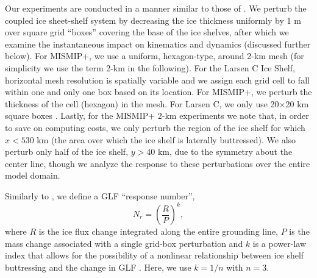 \documentclass[tc, manuscript]{copernicus}
\begin{document}
Our experiments are conducted in a manner similar to those of \citet{reese2018}. We perturb the coupled ice sheet-shelf system by decreasing the ice thickness uniformly by 1 m over square grid ``boxes'' covering the base of the ice shelves, after which we examine the instantaneous impact on kinematics and dynamics (discussed further below). For MISMIP+, we use a uniform, hexagon-type, around 2-km mesh (for simplicity we use the term 2-km in the following). For the Larsen C Ice Shelf, horizontal mesh resolution is spatially variable and we assign each grid cell to fall within one and only one box based on its location. For MISMIP+, we perturb the thickness of the cell (hexagon) in the mesh. For Larsen C, we only use 20$\times$20 km square boxes \citep[the same resolution as in][]{reese2018}. Lastly, for the MISMIP+ 2-km experiments we note that, in order to save on computing costs, we only perturb the region of the ice shelf for which $x<530$ km (the area over which the ice shelf is laterally buttressed).  We also perturb only half of the ice shelf, $y>40$ km, due to the symmetry about the center line, though we analyze the response to these perturbations over the entire model domain. 

Similarly to \citet{reese2018}, we define a GLF ``response number'',
\begin{equation}
N_r = \left(\frac{R}{P}\right)^k,
\end{equation}
where $R$ is the ice flux change integrated along the entire grounding line, $P$ is the mass change associated with a single grid-box perturbation and $k$ is a power-law index that allows for the possibility of a nonlinear relationship between ice shelf buttressing and the change in GLF \citep[see also][]{schoof2007}. Here, we use $k=1/n$ with $n=3$.
\end{document}

